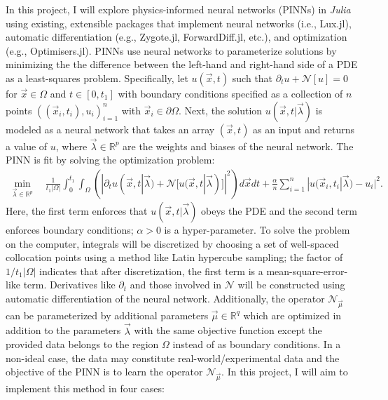 \documentclass[10pt]{article}
\newcommand{\R}{\mathbb R}
\newcommand{\1}{\mathbf 1}
\begin{document}
In this project, I will explore physics-informed neural networks (PINNs) in {\em Julia} using existing, extensible packages that implement neural networks (i.e., Lux.jl), automatic differentiation (e.g., Zygote.jl, ForwardDiff.jl, etc.), and optimization (e.g., Optimisers.jl).
PINNs use neural networks to parameterize solutions by minimizing the the difference between the left-hand and right-hand side of a PDE as a least-squares problem.
Specifically, let $u(\vec x,t)$ such that $\partial_t u + \mathcal{N}[u] = 0$ for $\vec x \in \Omega$ and $t \in [0,t_1]$ with boundary conditions specified as a collection of $n$ points $((\vec x_i,t_i),u_i)_{i=1}^n$ with $\vec x_i \in \partial \Omega$.
Next, the solution $u(\vec x, t|\vec \lambda)$ is modeled as a neural network that takes an array $(\vec x,t)$ as an input and returns a value of $u$, where $\vec \lambda \in \R^p$ are the weights and biases of the neural network.
The PINN is fit by solving the optimization problem:
\begin{align}
	\min_{\vec \lambda \in \R^p} \quad
	\frac{1}{t_1 |\Omega|}
	\int_0^{t_1}
	\int_\Omega\left( | \partial_t u(\vec x,t| \vec \lambda)  + \mathcal{N}[u(\vec x,t | \vec \lambda)]|^2 \right)d \vec x dt + \frac{\alpha }{n}\sum_{i=1}^n|u(\vec x_i,t_i | \vec \lambda) - u_i|^2.
	\label{PINNobj}
\end{align}
Here, the first term enforces that $u(\vec x,t| \vec \lambda)$ obeys the PDE and the second term enforces boundary conditions; $\alpha>0$ is a hyper-parameter.
To solve the problem on the computer, integrals will be discretized by choosing a set of well-spaced collocation points using a method like Latin hypercube sampling; the factor of $1/t_1|\Omega|$ indicates that after discretization, the first term is a mean-square-error-like term.
Derivatives like $\partial_t$ and those involved in $\mathcal{N}$ will be constructed using automatic differentiation of the neural network.
Additionally, the operator $\mathcal{N}_{\vec \mu}$ can be parameterized by additional parameters $\vec \mu \in \R^q$ which are optimized in addition to the parameters $\vec \lambda$ with the same objective function except the provided data belongs to the region $\Omega$ instead of as boundary conditions.
In a non-ideal case, the data may constitute real-world/experimental data and the objective of the PINN is to learn the operator $\mathcal{N}_{\vec \mu}$.
In this project, I will aim to implement this method in four cases:
\end{document}
